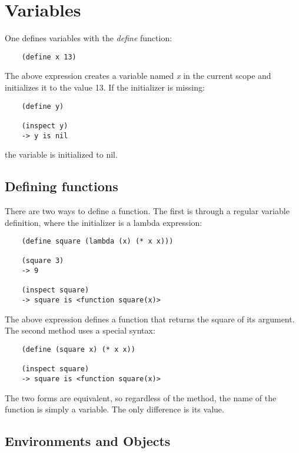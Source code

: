 \chapter{Variables}
\label{Variables}

One defines variables with the {\it define} function:

\begin{verbatim}
    (define x 13)
\end{verbatim}

The above expression creates a variable named {\it x} in the current
scope and initializes it to the value 13.
If the initializer is missing:

\begin{verbatim}
    (define y)

    (inspect y)
    -> y is nil
\end{verbatim}

the variable is initialized to nil.

\section{Defining functions}

There are two ways to define a function. The first is through a 
regular variable definition, where the initializer is a lambda
expression:

\begin{verbatim}
    (define square (lambda (x) (* x x)))

    (square 3)
    -> 9

    (inspect square)
    -> square is <function square(x)>
\end{verbatim}

The above expression defines a function that returns the square of
its argument. The second method uses a special syntax:

\begin{verbatim}
    (define (square x) (* x x))
    
    (inspect square)
    -> square is <function square(x)>
\end{verbatim}

The two forms are equivalent, so regardless of the method, the
name of the function is simply a variable. The only difference
is its value.

\section{Environments and Objects}


